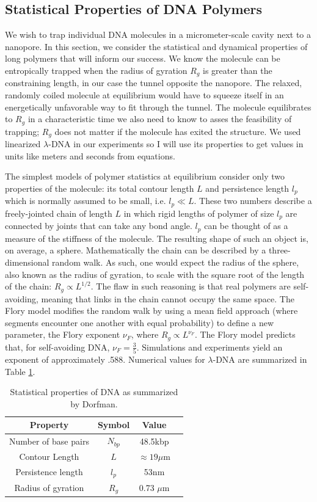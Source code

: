 \documentclass[aps,prl,preprint,groupedaddress]{revtex4}
\begin{document}
\subsection{Statistical Properties of DNA Polymers}

We wish to trap individual DNA molecules in a micrometer-scale cavity next to a nanopore.
In this section, we consider the statistical and dynamical properties of long polymers that will inform our success. We know the molecule can be entropically trapped when the radius of gyration \(R_g\) is greater than the constraining length, in our case the tunnel opposite the nanopore.
The relaxed, randomly coiled molecule at equilibrium would have to squeeze itself in an energetically unfavorable way to fit through the tunnel.\cite{trapping}
The molecule equilibrates to \(R_g\) in a characteristic time we also need to know to asses the feasibility of trapping;
\(R_g\) does not matter if the molecule has exited the structure.
We used linearized \(\lambda\)-DNA in our experiments so I will use its properties to get values in units like meters and seconds from equations.

The simplest models of polymer statistics at equilibrium consider only two properties of the molecule: its total contour length \(L\) and persistence length $l_p$ which is normally assumed to be small, i.e. \(l_p \ll L\).
These two numbers describe a freely-jointed chain of length \(L\) in which rigid lengths of polymer of size \(l_p\) are connected by joints that can take any bond angle.
\(l_p\) can be thought of as a measure of the stiffness of the molecule.
The resulting shape of such an object is, on average, a sphere.
Mathematically the chain can be described by a three-dimensional random walk.
As such, one would expect the radius of the sphere, also known as the radius of gyration, to scale with the square root of the length of the chain: \(R_g \propto L^{1/2}\).
The flaw in such reasoning is that real polymers are self-avoiding, meaning that links in the chain cannot occupy the same space.
The Flory model modifies the random walk by using a mean field approach (where segments encounter one another with equal probability) to define a new parameter, the Flory exponent \(\nu_F\), where \(R_g \propto L^{\nu_F}\).
The Flory model predicts that, for self-avoiding DNA, \(\nu_F = \frac{3}{5}\).
Simulations and experiments yield an exponent of approximately .588.\cite{exponent}
Numerical values for \(\lambda\)-DNA are summarized in Table \ref{tab:dna-table}.
\begin{table}[ht]
\centering
\begin{tabular}{ | c | c | c | c | }
\hline
Property & Symbol & Value \\ \hline
Number of base pairs & \(N_{bp}\) & 48.5kbp \\ \hline
Contour Length & $L$ & $\approx 19 \mu$m \\ \hline
Persistence length & \(l_p\) & 53nm \\ \hline
Radius of gyration & \(R_g\) & 0.73 $\mu$m \\ \hline
\end{tabular}
\caption{Statistical properties of DNA as summarized by Dorfman. \cite{dorfman}}
\label{tab:dna-table}
\end{table}
\end{document}
